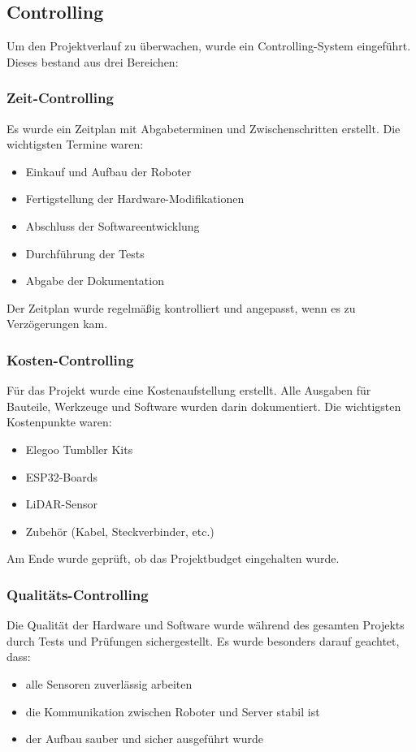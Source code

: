 \subsection{Controlling}
Um den Projektverlauf zu überwachen, wurde ein Controlling-System eingeführt. Dieses bestand aus drei Bereichen:
\subsubsection{Zeit-Controlling}
Es wurde ein Zeitplan mit Abgabeterminen und Zwischenschritten erstellt.
Die wichtigsten Termine waren:
\begin{itemize}
    \item Einkauf und Aufbau der Roboter
    \item Fertigstellung der Hardware-Modifikationen
    \item Abschluss der Softwareentwicklung
    \item Durchführung der Tests
    \item Abgabe der Dokumentation
\end{itemize}
Der Zeitplan wurde regelmäßig kontrolliert und angepasst, wenn es zu Verzögerungen kam.
\subsubsection{Kosten-Controlling}
Für das Projekt wurde eine Kostenaufstellung erstellt. Alle Ausgaben für Bauteile, Werkzeuge und Software wurden darin dokumentiert.
Die wichtigsten Kostenpunkte waren:
\begin{itemize}
    \item Elegoo Tumbller Kits
    \item ESP32-Boards
    \item LiDAR-Sensor
    \item Zubehör (Kabel, Steckverbinder, etc.)
\end{itemize}
Am Ende wurde geprüft, ob das Projektbudget eingehalten wurde.
\subsubsection{Qualitäts-Controlling}
Die Qualität der Hardware und Software wurde während des gesamten Projekts durch Tests und Prüfungen sichergestellt.
Es wurde besonders darauf geachtet, dass:
\begin{itemize}
    \item alle Sensoren zuverlässig arbeiten
    \item die Kommunikation zwischen Roboter und Server stabil ist
    \item der Aufbau sauber und sicher ausgeführt wurde
\end{itemize}
%
